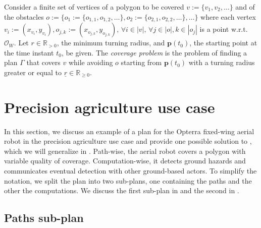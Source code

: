 \begin{pb}
  \label{pb:cov-pb}
  Consider a finite set of vertices of a polygon to be covered $v:=\{v_1,v_2,\dots\}$ and of the obstacles $o:=\{o_1:=\{o_{1,1},o_{1,2},\dots\},o_2:=\{o_{2,1},o_{2,2},\dots\},\dots\}$ where each vertex $v_i:=(x_{v_i},y_{v_i}),o_{j,k}:=(x_{o_{j,k}},y_{o_{j,k}}),\,\forall i\in|v|,\,\forall j\in|o|,k\in|o_j|$ is a point w.r.t. $\mathcal{O}_W$. Let $r\in\mathbb{R}_{>0}$, the minimum turning radius, and $\mathbf{p}(t_0)$, the starting point at the time instant $t_0$, be given. The \emph{coverage problem} is the problem of finding a plan $\Gamma$ that covers $v$ while avoiding $o$ starting from $\mathbf{p}(t_0)$ with a turning radius greater or equal to $\underline{r}\in\mathbb{R}_{\geq 0}$.
\end{pb}    


\section{Precision agriculture use case}
\label{sec:flight-plan}

In this section, we discuss an example of a plan for the Opterra fixed-wing aerial robot in the precision agriculture use case and provide one possible solution to , which we will generalize in . Path-wise, the aerial robot covers a polygon with variable quality of coverage. Computation-wise, it detects ground hazards and communicates eventual detection with other ground-based actors. To simplify the notation, we split the plan into two sub-plans, one containing the paths and the other the computations. We discuss the first sub-plan in  and the second in .

\subsection{Paths sub-plan}
\label{sec:path-wise}

